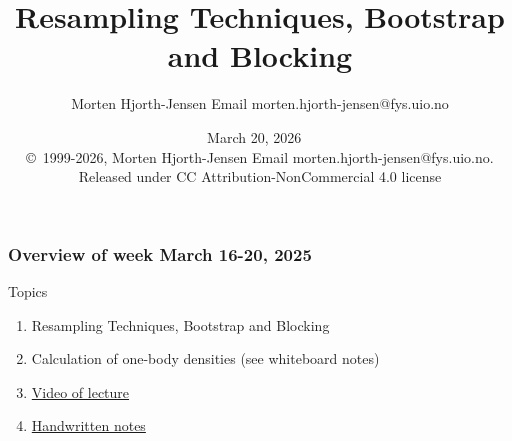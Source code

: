 \documentclass{beamer}
\begin{document}

\newcommand{\exercisesection}[1]{\subsection*{#1}}







\title{Resampling Techniques, Bootstrap and Blocking}


\author{Morten Hjorth-Jensen  Email morten.hjorth-jensen@fys.uio.no}

\date{March 20, 2026
\ \\ 
{\tiny \copyright\ 1999-2026, Morten Hjorth-Jensen  Email morten.hjorth-jensen@fys.uio.no. Released under CC Attribution-NonCommercial 4.0 license}
}

\begin{frame}
\titlepage
\end{frame}

\begin{frame}
\frametitle{Overview of week March 16-20, 2025}

\begin{block}{Topics }
\begin{enumerate}
\item Resampling Techniques, Bootstrap and Blocking 

\item Calculation of one-body densities (see whiteboard notes)

\item \href{{https://youtu.be/cnPh5FuGf3o}}{Video of lecture}

\item \href{{https://github.com/CompPhysics/ComputationalPhysics2/blob/gh-pages/doc/HandWrittenNotes/2025/NotesMarch21.pdf}}{Handwritten notes}
\end{enumerate}

\noindent
\end{block}
\end{frame}
\end{document}
